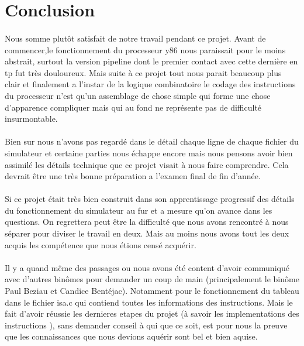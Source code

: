 \documentclass[12pt]{article}
\begin{document}
\newpage

\section{Conclusion}

\paragraph{} Nous somme plutôt satisfait de notre travail pendant ce projet. Avant de commencer,le fonctionnement du processeur y86 nous paraissait pour le moins abstrait, surtout la version pipeline dont le premier contact avec cette dernière en tp fut très douloureux. Mais suite à ce projet tout nous parait beaucoup plus clair et finalement a l'instar de la logique combinatoire le codage des instructions du processeur n'est qu'un assemblage de chose simple qui forme une chose d'apparence compliquer mais qui au fond ne représente pas de difficulté insurmontable.

\paragraph{} Bien sur nous n'avons pas regardé dans le détail chaque ligne de chaque fichier du simulateur et certaine parties nous échappe encore mais nous pensons avoir bien assimilé les détails technique que ce projet visait à nous faire comprendre. Cela devrait être une très bonne préparation a l’examen final de fin d'année.

\paragraph{} Si ce projet était très bien construit dans son apprentissage progressif des détails du fonctionnement du simulateur au fur et a mesure qu'on avance dans les questions. On regrettera peut être la difficulté que nous avons rencontré à nous séparer pour diviser le travail en deux. Mais au moins nous avons tout les deux acquis les compétence que nous étions censé acquérir.

\paragraph{} Il y a quand même des passages ou nous avons été content d'avoir communiqué avec d'autres binômes pour demander un coup de main (principalement le binôme Paul Beziau et Candice Bentéjac). Notamment pour le fonctionnement du tableau dans le fichier isa.c qui contiend toutes les informations des instructions.
Mais le fait d'avoir réussie les dernieres etapes du projet (à savoir les implementations des instructions ), sans demander conseil à qui que ce soit, est pour nous la preuve que les connaissances que nous devions aquérir sont bel et bien aquise.
\end{document}
